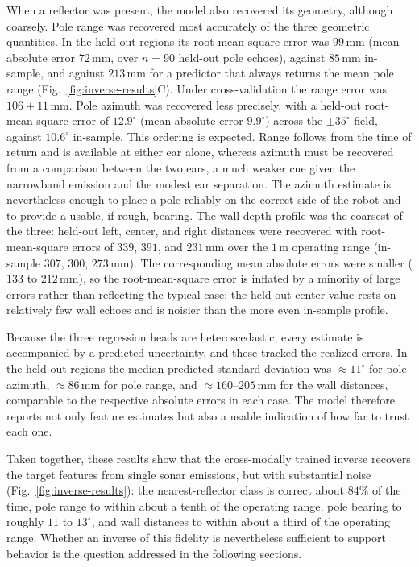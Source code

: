 \documentclass[11pt]{article}
\begin{document}
When a reflector was present, the model also recovered its geometry, although coarsely. Pole range was recovered most accurately of the three geometric quantities. In the held-out regions its root-mean-square error was $99$\,mm (mean absolute error $72$\,mm, over $n=90$ held-out pole echoes), against $85$\,mm in-sample, and against $213$\,mm for a predictor that always returns the mean pole range (Fig.~\ref{fig:inverse-results}C). Under cross-validation the range error was $106 \pm 11$\,mm. Pole azimuth was recovered less precisely, with a held-out root-mean-square error of $12.9^{\circ}$ (mean absolute error $9.9^{\circ}$) across the $\pm 35^{\circ}$ field, against $10.6^{\circ}$ in-sample. This ordering is expected. Range follows from the time of return and is available at either ear alone, whereas azimuth must be recovered from a comparison between the two ears, a much weaker cue given the narrowband emission and the modest ear separation. The azimuth estimate is nevertheless enough to place a pole reliably on the correct side of the robot and to provide a usable, if rough, bearing. The wall depth profile was the coarsest of the three: held-out left, center, and right distances were recovered with root-mean-square errors of $339$, $391$, and $231$\,mm over the $1$\,m operating range (in-sample $307$, $300$, $273$\,mm). The corresponding mean absolute errors were smaller ($133$ to $212$\,mm), so the root-mean-square error is inflated by a minority of large errors rather than reflecting the typical case; the held-out center value rests on relatively few wall echoes and is noisier than the more even in-sample profile.


Because the three regression heads are heteroscedastic, every estimate is accompanied by a predicted uncertainty, and these tracked the realized errors. In the held-out regions the median predicted standard deviation was $\approx 11^{\circ}$ for pole azimuth, $\approx 86$\,mm for pole range, and $\approx 160$--$205$\,mm for the wall distances, comparable to the respective absolute errors in each case. The model therefore reports not only feature estimates but also a usable indication of how far to trust each one.


Taken together, these results show that the cross-modally trained inverse recovers the target features from single sonar emissions, but with substantial noise (Fig.~\ref{fig:inverse-results}): the nearest-reflector class is correct about $84\%$ of the time, pole range to within about a tenth of the operating range, pole bearing to roughly $11$ to $13^{\circ}$, and wall distances to within about a third of the operating range. Whether an inverse of this fidelity is nevertheless sufficient to support behavior is the question addressed in the following sections.
\end{document}
